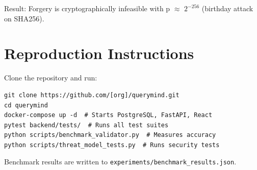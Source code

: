 \documentclass[conference]{IEEEtran}
\begin{document}
Result: Forgery is cryptographically infeasible with p $\approx$ $2^{-256}$ (birthday attack on SHA256).

\section{Reproduction Instructions}
\label{app:repro}

Clone the repository and run:
\begin{lstlisting}
git clone https://github.com/[org]/querymind.git
cd querymind
docker-compose up -d  # Starts PostgreSQL, FastAPI, React
pytest backend/tests/  # Runs all test suites
python scripts/benchmark_validator.py  # Measures accuracy
python scripts/threat_model_tests.py  # Runs security tests
\end{lstlisting}

Benchmark results are written to \texttt{experiments/benchmark\_results.json}.
\end{document}
